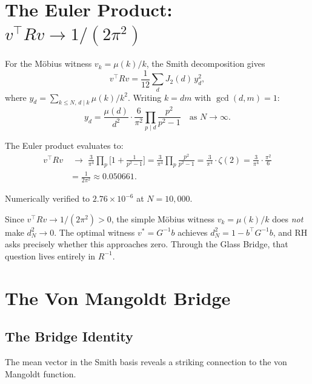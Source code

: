 \documentclass[11pt,a4paper]{article}
\begin{document}
\section{The Euler Product: $v^\top R v \to 1/(2\pi^2)$}
\label{sec:euler}

For the M\"obius witness $v_k = \mu(k)/k$, the Smith decomposition
gives
\[
  v^\top R v = \frac{1}{12} \sum_d J_2(d)\,y_d^2,
\]
where $y_d = \sum_{k \leq N,\, d \mid k} \mu(k)/k^2$.
Writing $k = dm$ with $\gcd(d,m) = 1$:
\[
  y_d = \frac{\mu(d)}{d^2} \cdot \frac{6}{\pi^2}
  \prod_{p \mid d} \frac{p^2}{p^2 - 1}
  \quad \text{as } N \to \infty.
\]

The Euler product evaluates to:
\begin{align*}
  v^\top R v &\;\longrightarrow\;
  \frac{3}{\pi^4} \prod_p \biggl[1 + \frac{1}{p^2 - 1}\biggr]
  = \frac{3}{\pi^4} \prod_p \frac{p^2}{p^2 - 1}
  = \frac{3}{\pi^4} \cdot \zeta(2)
  = \frac{3}{\pi^4} \cdot \frac{\pi^2}{6} \\
  &= \frac{1}{2\pi^2} \approx 0.050661.
\end{align*}

\noindent
Numerically verified to $2.76 \times 10^{-6}$ at $N = 10{,}000$.

\begin{remark}
Since $v^\top R v \to 1/(2\pi^2) > 0$, the simple M\"obius
witness $v_k = \mu(k)/k$ does \emph{not} make $d_N^2 \to 0$.
The optimal witness $v^* = G^{-1} b$ achieves $d_N^2 = 1 - b^\top G^{-1} b$,
and RH asks precisely whether this approaches zero.
Through the Glass Bridge, that question lives entirely in $R^{-1}$.
\end{remark}

\section{The Von Mangoldt Bridge}
\label{sec:vonmangoldt}

\subsection{The Bridge Identity}

The mean vector in the Smith basis reveals a striking connection
to the von Mangoldt function.
\end{document}
